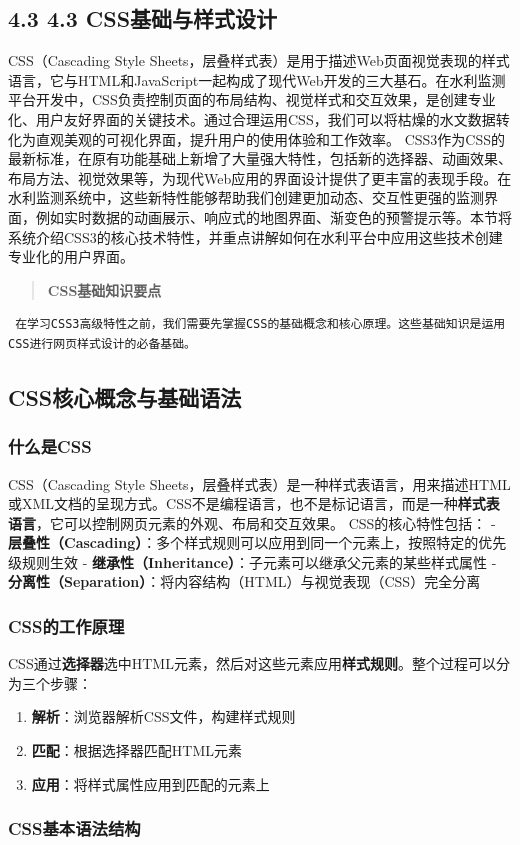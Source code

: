 \subsection{4.3 4.3 CSS基础与样式设计}\label{cssux57faux7840ux4e0eux6837ux5f0fux8bbeux8ba1} CSS（Cascading Style Sheets，层叠样式表）是用于描述Web页面视觉表现的样式语言，它与HTML和JavaScript一起构成了现代Web开发的三大基石。在水利监测平台开发中，CSS负责控制页面的布局结构、视觉样式和交互效果，是创建专业化、用户友好界面的关键技术。通过合理运用CSS，我们可以将枯燥的水文数据转化为直观美观的可视化界面，提升用户的使用体验和工作效率。 CSS3作为CSS的最新标准，在原有功能基础上新增了大量强大特性，包括新的选择器、动画效果、布局方法、视觉效果等，为现代Web应用的界面设计提供了更丰富的表现手段。在水利监测系统中，这些新特性能够帮助我们创建更加动态、交互性更强的监测界面，例如实时数据的动画展示、响应式的地图界面、渐变色的预警提示等。本节将系统介绍CSS3的核心技术特性，并重点讲解如何在水利平台中应用这些技术创建专业化的用户界面。 \begin{quote} \textbf{CSS基础知识要点} \end{quote} \begin{verbatim} 在学习CSS3高级特性之前，我们需要先掌握CSS的基础概念和核心原理。这些基础知识是运用CSS进行网页样式设计的必备基础。 \end{verbatim} \subsection{CSS核心概念与基础语法}\label{cssux6838ux5fc3ux6982ux5ff5ux4e0eux57faux7840ux8bedux6cd5} \subsubsection{什么是CSS}\label{ux4ec0ux4e48ux662fcss} CSS（Cascading Style Sheets，层叠样式表）是一种样式表语言，用来描述HTML或XML文档的呈现方式。CSS不是编程语言，也不是标记语言，而是一种\textbf{样式表语言}，它可以控制网页元素的外观、布局和交互效果。 CSS的核心特性包括： - \textbf{层叠性（Cascading）}：多个样式规则可以应用到同一个元素上，按照特定的优先级规则生效 - \textbf{继承性（Inheritance）}：子元素可以继承父元素的某些样式属性 - \textbf{分离性（Separation）}：将内容结构（HTML）与视觉表现（CSS）完全分离 \subsubsection{CSS的工作原理}\label{cssux7684ux5de5ux4f5cux539fux7406} CSS通过\textbf{选择器}选中HTML元素，然后对这些元素应用\textbf{样式规则}。整个过程可以分为三个步骤： \begin{enumerate} \def\labelenumi{\arabic{enumi}.} \item \textbf{解析}：浏览器解析CSS文件，构建样式规则 \item \textbf{匹配}：根据选择器匹配HTML元素 \item \textbf{应用}：将样式属性应用到匹配的元素上 \end{enumerate} \subsubsection{CSS基本语法结构}\label{cssux57faux672cux8bedux6cd5ux7ed3ux6784} 